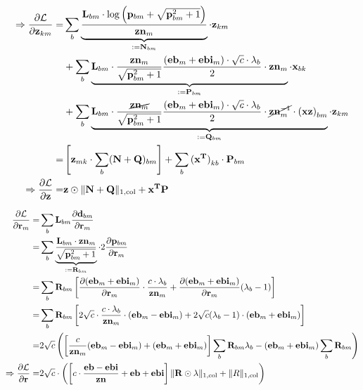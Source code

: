 \documentclass{article}
\begin{document}
\begin{align*}
    \Rightarrow \ddfrac{\mathcal{L}}{\v{z}{km}} =& \sum_b \underbrace{\frac{\v{L}{bm} \cdot \log \left(\v{p}{bm} + \sqrt{\v{p}{bm}^2 + 1} \right)}{\v{zn}{m}} }_{:= \v{N}{bm}} \cdot \v{z}{km} \\
    &+ \sum_b \underbrace{\v{L}{bm} \cdot \frac{\v{zn}{m}}{\sqrt{\v{p}{bm}^2 + 1}} \frac{(\v{eb}{m} + \v{ebi}{m}) \cdot \sqrt{c} \cdot \lambda_b}{2} \cdot \v{zn}{m}}_{:= \v{P}{bm}} \cdot \v{x}{bk} \\
    &+ \sum_b \underbrace{\v{L}{bm} \cdot \frac{\cancel{\v{zn}{m}}}{\sqrt{\v{p}{bm}^2 + 1}} \frac{(\v{eb}{m} + \v{ebi}{m}) \cdot \sqrt{c} \cdot \lambda_b}{2} \cdot \cancel{\v{zn}{m}^{-1}} \cdot \v{(xz)}{bm}}_{:= \v{Q}{bm}} \cdot \v{z}{km} \\
    =& \left[ \v{z}{mk} \cdot \sum_b (\v{N} + \v{Q})_{bm} \right] + \sum_b \v{(x^T)}{kb} \cdot \v{P}{bm} \\
    \Rightarrow \ddfrac{\mathcal{L}}{\v{z}} =& \v{z} \odot \colnorm{\v{N} + \v{Q}} + \v{x^T} \v{P}
\end{align*}

\begin{align*}
    \ddfrac{\mathcal{L}}{\v{r}_m} =& \sum_b \v{L}{bm} \ddfrac{\v{d}{bm}}{\v{r}{m}} \\
    =& \sum_b \underbrace{\frac{\v{L}{bm} \cdot \v{zn}{m}}{\sqrt{\v{p}{bm}^2 + 1}}}_{:= \v{R}{bm}} \cdot 2 \ddfrac{\v{p}{bm}}{\v{r}{m}} \\
    =& \sum_b \v{R}{bm} \left[ \ddfrac{(\v{eb}{m} + \v{ebi}{m})}{\v{r}{m}} \cdot \frac{c \cdot \lambda_b}{\v{zn}{m}} + \ddfrac{(\v{eb}{m} + \v{ebi}{m})}{\v{r}{m}} (\lambda_b - 1) \right] \\
    =& \sum_b \v{R}{bm} \left[ 2\sqrt{c} \cdot \frac{c \cdot \lambda_b}{\v{zn}{m}} \cdot (\v{eb}{m} - \v{ebi}{m}) + 2\sqrt{c} (\lambda_b - 1) \cdot (\v{eb}{m} + \v{ebi}{m}) \right] \\
    =& 2\sqrt{c}\left(\left[\frac{c}{\v{zn}{m}}(\v{eb}{m}-\v{ebi}{m})+(\v{eb}{m}+\v{ebi}{m})\right]\sum_b \v{R}{bm}\lambda_b -(\v{eb}{m}+\v{ebi}{m})\sum_b \v{R}{bm}\right) \\
    \Rightarrow \ddfrac{\mathcal{L}}{\v{r}} =& 2 \sqrt{c} \cdot \left( \left[ c\cdot \frac{\v{eb} - \v{ebi}}{\v{zn}} + \v{eb} + \v{ebi} \right] \colnorm{\v{R} \odot \lambda} + \colnorm{R} \right)
\end{align*}
\end{document}
